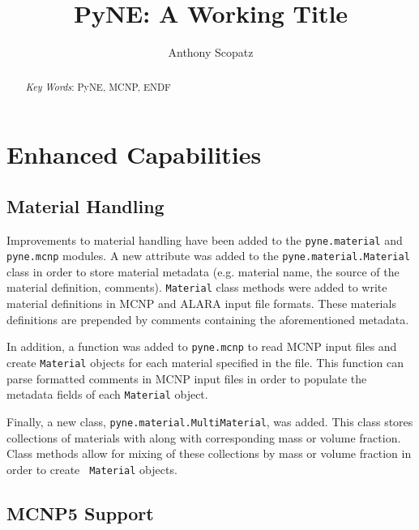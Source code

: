 \documentclass{ansconf}
\begin{document}
\title{PyNE: A Working Title}

\author{Anthony Scopatz}

\maketitle

\begin{abstract}
\raggedright

\emph{Key Words}: PyNE, MCNP, ENDF
\end{abstract}

\setlength{\baselineskip}{12pt}


\section{Enhanced Capabilities}

\subsection{Material Handling}

Improvements to material handling have been added to the \verb|pyne.material|
and \verb|pyne.mcnp| modules. A new attribute was added to the
\verb|pyne.material.Material| class in order to store material metadata (e.g.
material name, the source of the material definition, comments).
\verb|Material| class methods were added to write material definitions in MCNP
and ALARA \cite{wilson_alara:_1999} input file formats.  These materials
definitions are prepended by comments containing the aforementioned metadata. 

In addition, a function was added to \verb|pyne.mcnp| to read MCNP input files and
create \verb|Material| objects for each material specified in the file. This
function can parse formatted comments in MCNP input files in order to
populate the metadata fields of each \verb|Material| object.

Finally, a new class, \verb|pyne.material.MultiMaterial|, was added.  This
class stores collections of materials with along with corresponding mass or
volume fraction.  Class methods allow for mixing of these collections by mass
or volume fraction in order to create \verb| Material| objects.


\subsection{MCNP5 Support}
\end{document}
